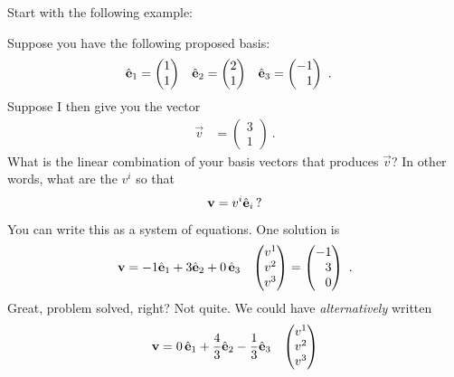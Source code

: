 \documentclass[12pt, oneside]{report}    %
\begin{document}
Start with the following example:
\begin{example}
Suppose you have the following proposed basis:
\begin{align}
    \bas{e}_1 &=
    \begin{pmatrix}
        1\\
        1
    \end{pmatrix}
    &
    \bas{e}_2 &=
    \begin{pmatrix}
        2\\
        1
    \end{pmatrix}
    &
    \bas{e}_3 &=
    \begin{pmatrix}
        -1\\
        \pp 1
    \end{pmatrix} \ .
    \label{eq:eg:too:many:basis:vectors:basis}
\end{align}
Suppose I then give you the vector
\begin{align}
    \vec{v} &=
    \begin{pmatrix}
        3 \\ 1
    \end{pmatrix} \ .
\end{align}
What is the linear combination of your basis vectors that produces $\vec{v}$? In other words, what are the $v^i$ so that
\begin{align}
    \mathbf{v}= v^i \hat{\mathbf{e}}_i \, ?
\end{align}
You can write this as a system of equations. One solution is
\begin{align}
    \vec{v} &= -1\bas{e}_1 + 3\bas{e}_2 + 0\,\bas{e}_3 
    &
    \begin{pmatrix}
        v^1 \\ v^2 \\ v^3
    \end{pmatrix}
    =
    \begin{pmatrix}
        -1 \\ \pp 3 \\ \pp 0
    \end{pmatrix} \ .
\end{align}
Great, problem solved, right? Not quite. We could have \emph{alternatively} written
\begin{align}
    \vec{v} &= 0\,\bas{e}_1 + \frac{4}{3}\bas{e}_2 - \frac{1}{3}\bas{e}_3 
    &
    \begin{pmatrix}
        v^1 \\ v^2 \\ v^3
    \end{pmatrix}

\end{align}
\end{example}
\end{document}
